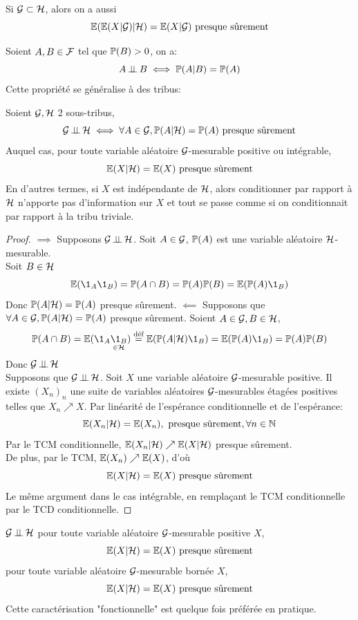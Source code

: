 \documentclass[]{report}
\begin{document}
    \begin{re}{}{}
        Si $\mathcal{G}\subset \mathcal{H}$, alors on a aussi
        \[\mathbb{E}(\mathbb{E}(X|\mathcal{G})|\mathcal{H})=\mathbb{E}(X|\mathcal{G})\text{ presque sûrement}\]
    \end{re}

    Soient $A,B\in \mathcal{F}$ tel que $\mathbb{P}(B)>0$, on a:
    \[A\operatorname{\perp \!\!\! \perp} B\iff \mathbb{P}(A|B)=\mathbb{P}(A)\]
    Cette propriété se généralise à des tribus:

    \begin{prop}{}{}
        Soient $\mathcal{G}, \mathcal{H}$ 2 sous-tribus,
        \[\mathcal{G}\operatorname{\perp \!\!\! \perp} \mathcal{H} \iff \forall A\in \mathcal{G}, \mathbb{P}(A|\mathcal{H})=\mathbb{P}(A)\text{ presque sûrement}\]
        Auquel cas, pour toute variable aléatoire $\mathcal{G}$-mesurable positive ou intégrable,
        \[\mathbb{E}(X|\mathcal{H})=\mathbb{E}(X)\text{ presque sûrement}\]
        En d'autres termes, si $X$ est indépendante de $\mathcal{H}$, alors conditionner par rapport à $\mathcal{H}$ n'apporte pas d'information sur $X$ et tout se passe comme si on conditionnait par rapport à la tribu triviale.
    \end{prop}

    \begin{proof}
        $\implies$ Supposons $\mathcal{G} \operatorname{\perp \!\!\! \perp} \mathcal{H}$. Soit $A\in \mathcal{G}$, $\mathbb{P}(A)$ est une variable aléatoire $\mathcal{H}$-mesurable.\\
        Soit $B\in \mathcal{H}$
        \[\Ea(\1_A \1_B)=\Pa(A\cap B)=\Pa(A)\Pa(B)=\Ea(\Pa(A)\1_B)\]
        Donc $\mathbb{P}(A|\mathcal{H})=\mathbb{P}(A)$ presque sûrement.
        $\impliedby$ Supposons que $\forall A\in \mathcal{G}, \mathbb{P}(A|\mathcal{H})=\mathbb{P}(A)$ presque sûrement. Soient $A\in \mathcal{G},B\in \mathcal{H}$,
        \[\Pa(A\cap B)=\Ea(\1_A \underset{\in \Hr}{\1_B})\overset{\text{déf}}{=}\Ea(\Pa(A|\Hr)\1_B)=\Ea(\Pa(A)\1_B)=\Pa(A)\Pa(B)\]
        Donc $\mathcal{G}\operatorname{\perp \!\!\! \perp} \mathcal{H}$\\
        Supposons que $\mathcal{G}\operatorname{\perp \!\!\! \perp} \mathcal{H}$. Soit $X$ une variable aléatoire $\mathcal{G}$-mesurable positive. Il existe $(X_n)_n$ une suite de variables aléatoires $\mathcal{G}$-mesurables étagées positives telles que $X_n\nearrow X$. Par linéarité de l'espérance conditionnelle et de l'espérance:
        \[\mathbb{E}(X_n|\mathcal{H})=\mathbb{E}(X_n),\text{ presque sûrement}, \forall n\in \mathbb{N}\]
        Par le TCM conditionnelle, $\mathbb{E}(X_n|\mathcal{H})\nearrow \mathbb{E}(X|\mathcal{H})$ presque sûrement.\\
        De plus, par le TCM, $\mathbb{E}(X_n)\nearrow \mathbb{E}(X)$, d'où
        \[\mathbb{E}(X|\mathcal{H})=\mathbb{E}(X)\text{ presque sûrement}\]
        Le même argument dans le cas intégrable, en remplaçant le TCM conditionnelle par le TCD conditionnelle.
    \end{proof}

    \begin{re}{}{}
        $\mathcal{G}\operatorname{\perp \!\!\! \perp} \mathcal{H}$ \ssi pour toute variable aléatoire $\mathcal{G}$-mesurable positive $X$,
        \[\mathbb{E}(X|\mathcal{H})=\mathbb{E}(X)\text{ presque sûrement}\]
        \ssi pour toute variable aléatoire $\mathcal{G}$-mesurable bornée $X$,
        \[\mathbb{E}(X|\mathcal{H})=\mathbb{E}(X)\text{ presque sûrement}\]
        Cette caractérisation "fonctionnelle" est quelque fois préférée en pratique.
    \end{re}
\end{document}
